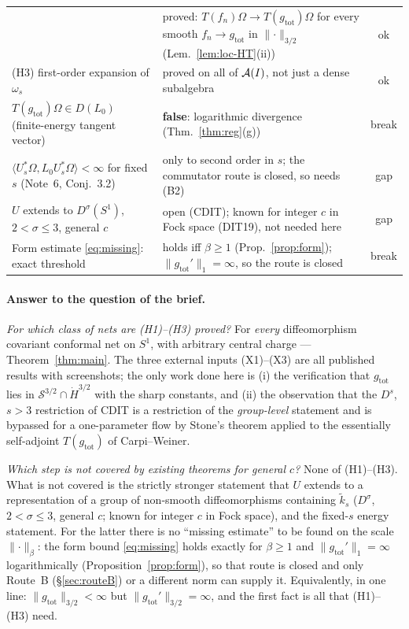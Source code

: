 \documentclass[11pt]{article}
\newcommand{\Om}{\Omega}
\newcommand{\ip}[2]{\langle #1,#2\rangle}
\newcommand{\norm}[1]{\lVert #1\rVert}
\newcommand{\gtot}{g_{\mathrm{tot}}}
\newcommand{\ktil}{\widetilde k}
\begin{document}
\begin{center}
\begin{tabularx}{\textwidth}{>{\raggedright\arraybackslash}p{} >{\raggedright\arraybackslash}X c}
 & proved: $T(f_n)\Om\to T(\gtot)\Om$ for every smooth $f_n\to\gtot$ in $\norm\cdot_{3/2}$ (Lem.~\ref{lem:loc-HT}(ii)) & ok\\
(H3) first-order expansion of $\omega_s$
 & proved on all of $\mathcal A(I)$, not just a dense subalgebra & ok\\
$T(\gtot)\Om\in D(L_0)$ (finite-energy tangent vector)
 & \textbf{false}: logarithmic divergence (Thm.~\ref{thm:reg}(g)) & break\\
$\ip{U_s^*\Om}{L_0U_s^*\Om}<\infty$ for fixed $s$ (Note~6, Conj.~3.2)
 & only to second order in $s$; the commutator route is closed, so needs (B2) & gap\\
$U$ extends to $D^\sigma(S^1)$, $2<\sigma\le3$, general $c$
 & open (CDIT); known for integer $c$ in Fock space (DIT19), not needed here & gap\\
Form estimate \eqref{eq:missing}: exact threshold
 & holds iff $\beta\ge1$ (Prop.~\ref{prop:form}); $\norm{\gtot'}_1=\infty$, so the route is closed & break\\
\bottomrule
\end{tabularx}
\end{center}

\paragraph{Answer to the question of the brief.}
\emph{For which class of nets are (H1)--(H3) proved?}  For \emph{every} diffeomorphism covariant conformal net on
$S^1$, with arbitrary central charge --- Theorem~\ref{thm:main}.  The three external inputs (X1)--(X3) are all
published results with screenshots; the only work done here is (i) the verification that $\gtot$ lies in
$\mathcal S^{3/2}\cap\dot H^{3/2}$ with the sharp constants, and (ii) the observation that the
$D^s$, $s>3$ restriction of CDIT is a restriction of the \emph{group-level} statement and is bypassed for a
one-parameter flow by Stone's theorem applied to the essentially self-adjoint $T(\gtot)$ of Carpi--Weiner.

\emph{Which step is not covered by existing theorems for general $c$?}  None of (H1)--(H3).  What is not covered is
the strictly stronger statement that $U$ extends to a representation of a group of non-smooth diffeomorphisms
containing $\ktil_s$ ($D^\sigma$, $2<\sigma\le3$, general $c$; known for integer $c$ in Fock space), and the
fixed-$s$ energy statement.  For the latter there is no ``missing estimate'' to be found on the scale
$\norm\cdot_\beta$: the form bound \eqref{eq:missing} holds exactly for $\beta\ge1$ and
$\norm{\gtot'}_1=\infty$ logarithmically (Proposition~\ref{prop:form}), so that route is closed and only Route~B
(\S\ref{sec:routeB}) or a different norm can supply it.  Equivalently,
in one line: $\norm{\gtot}_{3/2}<\infty$ but $\norm{\gtot'}_{3/2}=\infty$, and the first fact is all that
(H1)--(H3) need.
\end{document}
